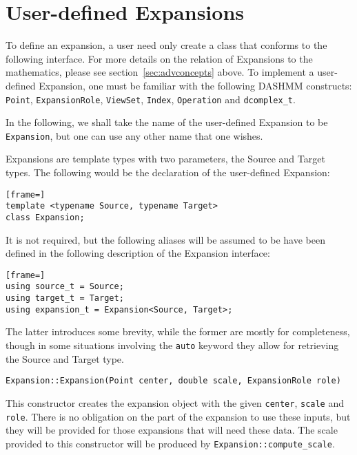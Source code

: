 \section{User-defined Expansions}

To define an expansion, a user need only create a class that conforms to the
following interface. For more details on the relation of Expansions to the
mathematics, please see section~\ref{sec:advconcepts} above. To implement a
user-defined Expansion, one must be familiar with the following DASHMM
constructs: \texttt{Point}, \texttt{ExpansionRole}, \texttt{ViewSet},
\texttt{Index}, \texttt{Operation} and \texttt{dcomplex\_t}.

In the following, we shall take the name of the user-defined Expansion to
be \texttt{Expansion}, but one can use any other name that one wishes.

Expansions are template types with two parameters, the Source and Target
types. The following would be the declaration of the user-defined Expansion:

\begin{lstlisting}[frame=]
template <typename Source, typename Target>
class Expansion;
\end{lstlisting}

\noindent It is not required, but the following aliases will be assumed to be
have been defined in the following description of the Expansion interface:

\begin{lstlisting}[frame=]
using source_t = Source;
using target_t = Target;
using expansion_t = Expansion<Source, Target>;
\end{lstlisting}

\noindent The latter introduces some brevity, while the former are mostly
for completeness, though in some situations involving the \texttt{auto} keyword
they allow for retrieving the Source and Target type.

\begin{lstlisting}
Expansion::Expansion(Point center, double scale, ExpansionRole role)
\end{lstlisting}

\noindent This constructor creates the expansion object with the given
\texttt{center}, \texttt{scale} and \texttt{role}. There is no obligation on
the part of the expansion to use these inputs, but they will be provided for
those expansions that will need these data.
The scale provided to this constructor will be produced by
\texttt{Expansion::compute\_scale}.

